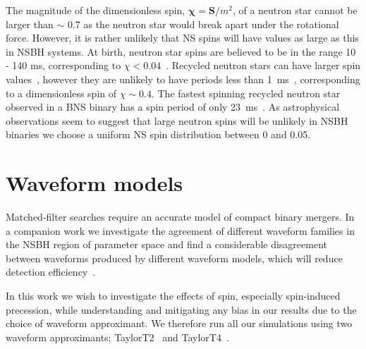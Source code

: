 The magnitude of the dimensionless spin, $\bm{\chi} = {\bm{S}/ 
{m}^2}$, of
a neutron star cannot be larger than $\sim$ 0.7 \cite{Lo:2010bj} as the
neutron star would break apart under the rotational force.
However, it is rather
unlikely that \ac{NS} spins will have values as large as this in \ac{NSBH}
systems. At birth, neutron star spins are believed to be in the range 10 -
140 ms, corresponding to $\chi < 0.04$~\cite{Lorimer:2008se,Mandel:2009nx}.
Recycled neutron stars can have larger spin values~\cite{Bildsten:1997vw},
however they are unlikely to have periods less than
1~ms~\cite{Chakrabarty:2008gz}, corresponding to a
dimensionless spin of $\chi \sim 0.4$. The fastest spinning recycled neutron
star observed in a \ac{BNS} binary has a spin period of only 
23~ms~\cite{Burgay:2003jj}. As astrophysical observations seem to suggest that 
large neutron spins will be unlikely in \ac{NSBH} binaries we choose a uniform 
\ac{NS} spin distribution between 0 and 0.05.

\section{Waveform models}
\label{sec:waveform_model}

Matched-filter searches require an accurate model of compact binary mergers.
In a companion work we investigate the agreement of different waveform
families in the \ac{NSBH} region of parameter space and find a considerable
disagreement between waveforms produced by different waveform models, which
will reduce detection efficiency~\cite{Nitz:2013mxa}.

In this work we wish to investigate the effects of spin, especially spin-induced
precession, while understanding and mitigating any bias in our results due to 
the choice of waveform approximant. We therefore run all our simulations using 
two waveform approximants; TaylorT2~\cite{Damour:2000zb} and 
TaylorT4~\cite{Buonanno:2002fy}.

